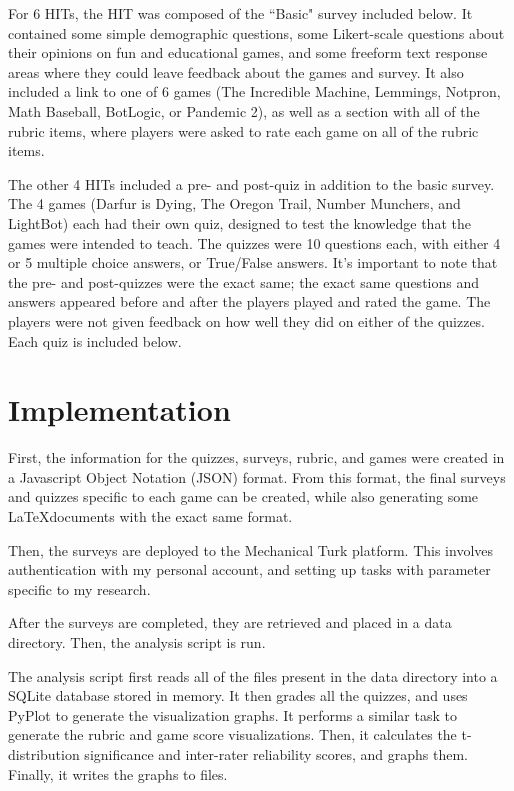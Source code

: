 		For 6 HITs, the HIT was composed of the ``Basic" survey included below. It contained some simple demographic questions, some Likert-scale questions about their opinions on fun and educational games, and some freeform text response areas where they could leave feedback about the games and survey. It also included a link to one of 6 games (The Incredible Machine, Lemmings, Notpron, Math Baseball, BotLogic, or Pandemic 2), as well as a section with all of the rubric items, where players were asked to rate each game on all of the rubric items.

		The other 4 HITs included a pre- and post-quiz in addition to the basic survey. The 4 games (Darfur is Dying, The Oregon Trail, Number Munchers, and LightBot) each had their own quiz, designed to test the knowledge that the games were intended to teach. The quizzes were 10 questions each, with either 4 or 5 multiple choice answers, or True/False answers. It's important to note that the pre- and post-quizzes were the exact same; the exact same questions and answers appeared before and after the players played and rated the game. The players were not given feedback on how well they did on either of the quizzes. Each quiz is included below.  

	\section{Implementation}
		First, the information for the quizzes, surveys, rubric, and games were created in a Javascript Object Notation (JSON) format. From this format, the final surveys and quizzes specific to each game can be created, while also generating some \LaTeX documents with the exact same format.

		Then, the surveys are deployed to the Mechanical Turk platform. This involves authentication with my personal account, and setting up tasks with parameter specific to my research.

		After the surveys are completed, they are retrieved and placed in a data directory. Then, the analysis script is run.

		The analysis script first reads all of the files present in the data directory into a SQLite database stored in memory. It then grades all the quizzes, and uses PyPlot to generate the visualization graphs. It performs a similar task to generate the rubric and game score visualizations. Then, it calculates the t-distribution significance and inter-rater reliability scores, and graphs them. Finally, it writes the graphs to files.

